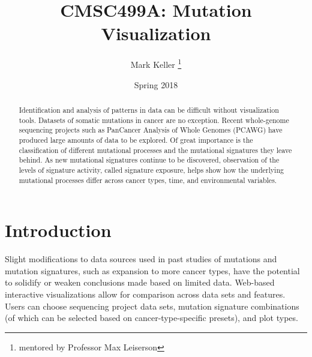 \documentclass[12pt, letterpaper]{article}
\title{CMSC499A: Mutation Visualization}
\author{Mark Keller \thanks{mentored by Professor Max Leiserson}}
\date{Spring 2018}
\begin{document}
\maketitle

\begin{abstract}
Identification and analysis of patterns in data can be difficult without visualization tools. 
Datasets of somatic mutations in cancer are no exception. 
Recent whole-genome sequencing projects such as PanCancer Analysis of Whole Genomes (PCAWG) have produced large amounts of data to be explored.
Of great importance is the classification of different mutational processes and the mutational signatures they leave behind.
As new mutational signatures continue to be discovered, observation of the levels of signature activity, called signature exposure, helps show how the underlying mutational processes differ across cancer types, time, and environmental variables.
\end{abstract}

\section{Introduction}
Slight modifications to data sources used in past studies of mutations and mutation signatures, such as expansion to more cancer types, have the potential to solidify or weaken conclusions made based on limited data.
Web-based interactive visualizations allow for comparison across data sets and features.
Users can choose sequencing project data sets, mutation signature combinations (of which can be selected based on cancer-type-specific presets), and plot types. 
\end{document}

